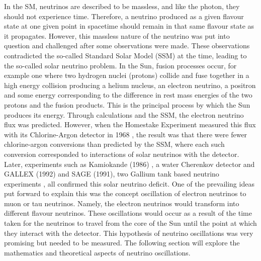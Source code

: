 \documentclass[11pt]{article}
\begin{document}
In the SM, neutrinos are described to be massless, and like the photon, they should not experience time. Therefore, a neutrino produced as a given flavour state at one given point in spacetime should remain in that same flavour state as it propagates. However, this massless nature of the neutrino was put into question and challenged after some observations were made. These observations contradicted the so-called Standard Solar Model (SSM) at the time, leading to the so-called solar neutrino problem. In the Sun, fusion processes occur, for example one where two hydrogen nuclei (protons) collide and fuse together in a high energy collision producing a helium nucleus, an electron neutrino, a positron and some energy corresponding to the difference in rest mass energies of the two protons and the fusion products. This is the principal process by which the Sun produces its energy. Through calculations and the SSM, the electron neutrino flux was predicted. However, when the Homestake Experiment \cite{Homestake} measured this flux with its Chlorine-Argon detector in 1968 \cite{Davis}, the result was that there were fewer chlorine-argon conversions than predicted by the SSM, where each such conversion corresponded to interactions of solar neutrinos with the detector. Later, experiments such as Kamiokande (1986) \cite{Hirata}, a water Cherenkov detector and GALLEX (1992) and SAGE (1991), two Gallium tank based neutrino experiments \cite{Anselmann} \cite{abazov}, all confirmed this solar neutrino deficit. One of the prevailing ideas put forward to explain this was the concept oscillation of electron neutrinos to muon or tau neutrinos. Namely, the electron neutrinos would transform into different flavour neutrinos. These oscillations would occur as a result of the time taken for the neutrinos to travel from the core of the Sun until the point at which they interact with the detector. This hypothesis of neutrino oscillations was very promising but needed to be measured. The following section will explore the mathematics and theoretical aspects of neutrino oscillations. 
\end{document}
